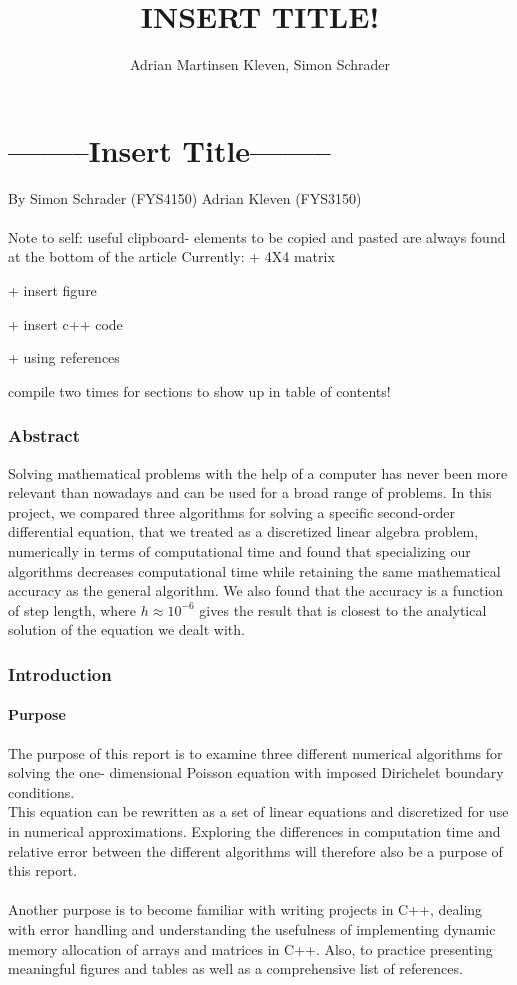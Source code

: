 \documentclass[10pt,a4paper]{article}
\author{Adrian Martinsen Kleven, Simon Schrader}
\title{INSERT TITLE!}
\begin{document}
\part*{--------Insert Title--------}
{\large By Simon Schrader (FYS4150) Adrian Kleven (FYS3150)}\\\\
Note to self: 
useful clipboard- elements to be copied and pasted are always found at the bottom of the article
Currently:
 + 4X4 matrix 

 + insert figure

 + insert c++ code
 
 + using references
 
 compile two times for sections to show up in table of contents!


\tableofcontents

\listoffigures
\listoftables

 
\clearpage
 
\section{Abstract}
Solving mathematical problems with the help of a computer has never been more relevant than nowadays and can be used for a broad range of problems. In this project, we compared three algorithms for solving a specific second-order differential equation, that we treated as a discretized linear algebra problem, numerically in terms of computational time and found that specializing our algorithms decreases computational time while retaining the same mathematical accuracy as the general algorithm. We also found that the accuracy is a function of step length, where  $h \approx 10^{-6}$ gives the result that is closest to the analytical solution of the equation we dealt with.
\section{Introduction}
\subsection{Purpose} 
The purpose of this report is to examine three different numerical algorithms for solving the one- dimensional Poisson equation with imposed Dirichelet boundary conditions. \\This equation can be rewritten as a set of linear equations and discretized for use in numerical approximations. Exploring the differences in computation time and relative error between the different algorithms will therefore also be a purpose of this report.\\\\
Another purpose is to become familiar with writing projects in C++, dealing with error handling and understanding the usefulness of implementing dynamic memory allocation of arrays and matrices in C++. Also, to practice presenting meaningful figures and tables as well as a comprehensive list of references.
\end{document}
